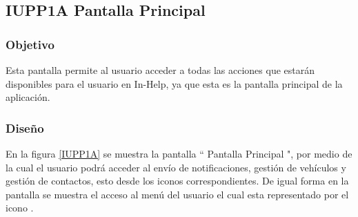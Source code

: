 \subsection{IUPP1A Pantalla Principal}

\subsubsection{Objetivo}

	
    Esta pantalla permite al usuario acceder a todas las acciones que estarán disponibles para el usuario en In-Help, ya que esta es la pantalla principal de la aplicación.

\subsubsection{Diseño}


    En la figura \ref{IUPP1A} se muestra la pantalla `` Pantalla Principal ", por medio de la cual el usuario podrá acceder al envío de notificaciones, gestión de vehículos y gestión de contactos, esto desde los iconos correspondientes. De igual forma en la pantalla se muestra el acceso al menú del usuario el cual esta representado por el icono \btnMenu.
    


